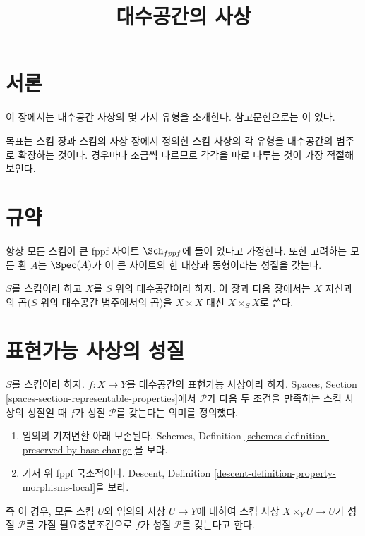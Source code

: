 

%


\title{대수공간의 사상}


\maketitle

\label{section-phantom}

\tableofcontents

\section{서론}
\label{section-introduction}

\noindent
이 장에서는 대수공간 사상의 몇 가지 유형을 소개한다.
참고문헌으로는 \cite{Kn}이 있다.

\medskip\noindent
목표는 스킴 장과 스킴의 사상 장에서 정의한 스킴 사상의 각 유형을
대수공간의 범주로 확장하는 것이다. 경우마다 조금씩 다르므로
각각을 따로 다루는 것이 가장 적절해 보인다.




\section{규약}
\label{section-conventions}

\noindent
항상 모든 스킴이 큰 fppf 사이트 $\Sch_{fppf}$에 들어 있다고
가정한다. 또한 고려하는 모든 환 $A$는 $\Spec(A)$가 이 큰
사이트의 한 대상과 동형이라는 성질을 갖는다.

\medskip\noindent
$S$를 스킴이라 하고 $X$를 $S$ 위의 대수공간이라 하자.
이 장과 다음 장에서는 $X$ 자신과의 곱($S$ 위의 대수공간 범주에서의 곱)을
$X \times X$ 대신 $X \times_S X$로 쓴다.





\section{표현가능 사상의 성질}
\label{section-representable}

\noindent
$S$를 스킴이라 하자.
$f : X \to Y$를 대수공간의 표현가능 사상이라 하자.
Spaces, Section \ref{spaces-section-representable-properties}에서
$\mathcal{P}$가 다음 두 조건을 만족하는 스킴 사상의 성질일 때
$f$가 성질 $\mathcal{P}$를 갖는다는 의미를 정의했다.
\begin{enumerate}
\item 임의의 기저변환 아래 보존된다.
Schemes, Definition \ref{schemes-definition-preserved-by-base-change}을 보라.
\item 기저 위 fppf 국소적이다. Descent, Definition
\ref{descent-definition-property-morphisms-local}을 보라.
\end{enumerate}
즉 이 경우, 모든 스킴 $U$와 임의의 사상 $U \to Y$에 대하여
스킴 사상 $X \times_Y U \to U$가 성질 $\mathcal{P}$를 가질
필요충분조건으로 $f$가 성질 $\mathcal{P}$를 갖는다고 한다.

